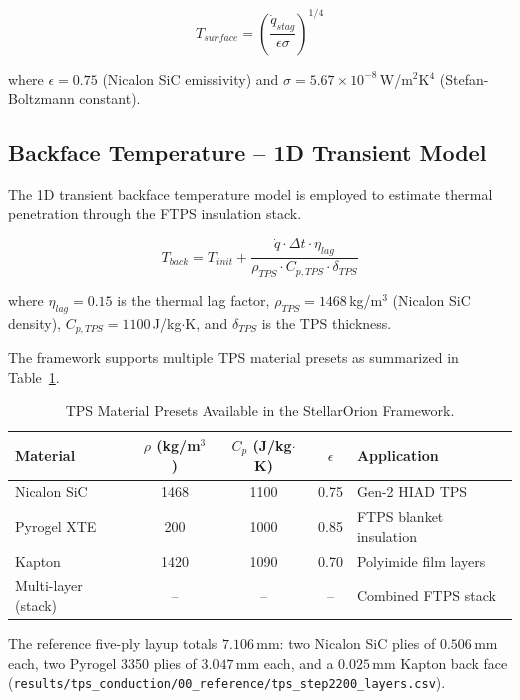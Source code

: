 \begin{equation}
    T_{surface} = \left(\frac{\dot{q}_{stag}}{\epsilon \sigma}\right)^{1/4}
\end{equation}

where $\epsilon = 0.75$ (Nicalon SiC emissivity) and $\sigma = 5.67 \times 10^{-8}$\,W/m$^2$K$^4$ (Stefan-Boltzmann constant).

\subsection{Backface Temperature -- 1D Transient Model}
The 1D transient backface temperature model is employed to estimate thermal penetration through the FTPS insulation stack.

\begin{equation}
    T_{back} = T_{init} + \frac{\dot{q} \cdot \Delta t \cdot \eta_{lag}}{\rho_{TPS} \cdot C_{p,TPS} \cdot \delta_{TPS}}
\end{equation}

where $\eta_{lag} = 0.15$ is the thermal lag factor, $\rho_{TPS} = 1468$\,kg/m$^3$ (Nicalon SiC density), $C_{p,TPS} = 1100$\,J/kg$\cdot$K, and $\delta_{TPS}$ is the TPS thickness.

The framework supports multiple TPS material presets as summarized in Table~\ref{tab:tps_materials}.

\begin{table}[H]
    \centering
    \caption{TPS Material Presets Available in the StellarOrion Framework.}
    \label{tab:tps_materials}
    \begin{tabularx}{\textwidth}{|l|c|c|c|>{\RaggedRight\arraybackslash}X|}
        \hline
        \textbf{Material} & \textbf{$\rho$ (kg/m$^3$)} & \textbf{$C_p$ (J/kg$\cdot$K)} & \textbf{$\epsilon$} & \textbf{Application} \\ \hline
        Nicalon SiC & 1468 & 1100 & 0.75 & Gen-2 HIAD TPS \\ \hline
        Pyrogel XTE & 200 & 1000 & 0.85 & FTPS blanket insulation \\ \hline
        Kapton & 1420 & 1090 & 0.70 & Polyimide film layers \\ \hline
        Multi-layer (stack) & -- & -- & -- & Combined FTPS stack \\ \hline
    \end{tabularx}
\end{table}

\noindent The reference five-ply layup totals $7.106$\,mm: two Nicalon SiC plies of $0.506$\,mm each, two Pyrogel 3350 plies of $3.047$\,mm each, and a $0.025$\,mm Kapton back face (\texttt{results/tps\_conduction/00\_reference/tps\_step2200\_layers.csv}).

